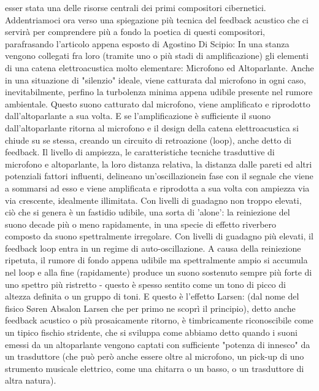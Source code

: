 esser stata una delle risorse centrali dei primi compositori cibernetici.
Addentriamoci ora verso una spiegazione più tecnica del feedback acustico
che ci servirà per comprendere più
a fondo la poetica di questi compositori,
parafrasando l'articolo appena esposto di Agostino Di Scipio:
In una stanza vengono collegati fra loro (tramite uno o più stadi di amplificazione) gli
elementi di una catena elettroacustica molto elementare: Microfono ed Altoparlante. Anche in
una situazione di "silenzio" ideale, viene catturata dal microfono in ogni caso,
inevitabilmente, perfino la turbolenza minima appena udibile presente nel rumore ambientale.
Questo suono catturato dal microfono, viene amplificato e riprodotto dall’altoparlante a sua
volta. E se l'amplificazione è sufficiente il suono dall’altoparlante ritorna al microfono e
il design della catena elettroacustica si chiude su se stessa,
creando un circuito di
retroazione (loop), anche detto di feedback.
Il livello di ampiezza, le caratteristiche
tecniche trasduttive di microfono e altoparlante, la loro distanza relativa, la distanza dalle
pareti ed altri potenziali fattori influenti, delineano un’oscillazionein fase con il segnale
che viene a sommarsi ad esso e viene amplificata e riprodotta a sua volta con ampiezza via via
crescente, idealmente illimitata. Con livelli di guadagno non troppo elevati, ciò che si
genera è un fastidio udibile, una sorta di 'alone':
la reiniezione del suono decade più o meno
rapidamente, in una specie di effetto riverbero composto da suono spettralmente irregolare.
Con livelli di guadagno più elevati, il feedback loop entra in un regime di auto-oscillazione.
A causa della reiniezione ripetuta, il rumore di fondo appena udibile ma spettralmente ampio
si accumula nel loop e alla fine (rapidamente) produce un suono sostenuto sempre più forte di
uno spettro più ristretto - questo è spesso sentito come un tono di picco di altezza definita
o un gruppo di toni. E questo è l'effetto Larsen: (dal nome del fisico Søren Absalon Larsen
che per primo ne scoprì il principio), detto anche feedback acustico o più prosaicamente
ritorno, è timbricamente riconoscibile come un tipico fischio stridente, che si sviluppa come
abbiamo detto quando i suoni emessi da un altoparlante vengono captati con sufficiente
"potenza di innesco" da un trasduttore (che può però anche essere oltre al microfono, un
pick-up di uno strumento musicale elettrico, come una chitarra o un basso, o un trasduttore di
altra natura).
